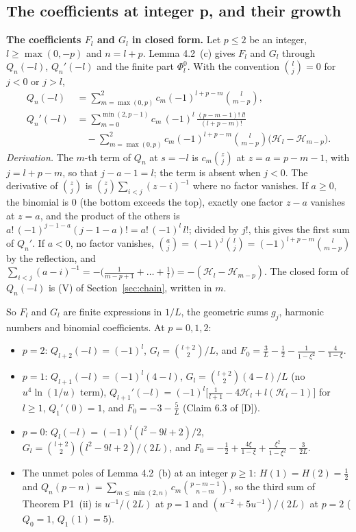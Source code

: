 \documentclass[11pt]{article}
\newcommand{\Har}{\mathcal{H}}
\begin{document}
\subsection{The coefficients at integer p, and their growth}\label{sec:coeff}

\noindent\textbf{The coefficients $F_l$ and $G_l$ in closed form.} Let $p\le2$ be an integer, $l\ge\max(0,-p)$ and $n=l+p$. Lemma 4.2~(c) gives $F_l$ and $G_l$ through $Q_n(-l)$, $Q_n'(-l)$ and the finite part $\Phi^0_l$. With the convention $\binom{l}{j}=0$ for $j<0$ or $j>l$,
\begin{align*}
Q_n(-l)&=\sum_{m=\max(0,p)}^{2}c_m(-1)^{l+p-m}\binom{l}{m-p},\\
Q_n'(-l)&=\sum_{m=0}^{\min(2,p-1)}c_m\,(-1)^l\,\frac{(p-m-1)!\;l!}{(l+p-m)!}\\
&\quad-\sum_{m=\max(0,p)}^{2}c_m(-1)^{l+p-m}\binom{l}{m-p}\bigl(\Har_l-\Har_{m-p}\bigr).
\end{align*}
\emph{Derivation.} The $m$-th term of $Q_n$ at $s=-l$ is $c_m\binom{z}{j}$ at $z=a=p-m-1$, with $j=l+p-m$, so that $j-a-1=l$; the term is absent when $j<0$. The derivative of $\binom{z}{j}$ is $\binom{z}{j}\sum_{i<j}(z-i)^{-1}$ where no factor vanishes. If $a\ge0$, the binomial is $0$ (the bottom exceeds the top), exactly one factor $z-a$ vanishes at $z=a$, and the product of the others is $a!\,(-1)^{j-1-a}(j-1-a)!=a!\,(-1)^l\,l!$; divided by $j!$, this gives the first sum of $Q_n'$. If $a<0$, no factor vanishes, $\binom{a}{j}=(-1)^j\binom{l}{j}=(-1)^{l+p-m}\binom{l}{m-p}$ by the reflection, and $\sum_{i<j}(a-i)^{-1}=-\bigl(\frac{1}{m-p+1}+\dots+\frac1l\bigr)=-(\Har_l-\Har_{m-p})$. The closed form of $Q_n(-l)$ is (V) of Section~\ref{sec:chain}, written in $m$.

So $F_l$ and $G_l$ are finite expressions in $1/L$, the geometric sums $g_j$, harmonic numbers and binomial coefficients. At $p=0,1,2$:
\begin{itemize}
\item $p=2$: $Q_{l+2}(-l)=(-1)^l$, $G_l=\binom{l+2}{2}/L$, and $F_0=\tfrac3L-\tfrac12-\tfrac{1}{1-\xi^2}-\tfrac{4}{1-\xi}$.
\item $p=1$: $Q_{l+1}(-l)=(-1)^l(4-l)$, $G_l=\binom{l+2}{2}(4-l)/L$ (no $u^4\ln(1/u)$ term), $Q_{l+1}'(-l)=(-1)^l\bigl[\frac{1}{l+1}-4\Har_l+l(\Har_l-1)\bigr]$ for $l\ge1$, $Q_1'(0)=1$, and $F_0=-3-\tfrac5L$ (Claim 6.3 of [D]).
\item $p=0$: $Q_l(-l)=(-1)^l(l^2-9l+2)/2$, $G_l=\binom{l+2}{2}(l^2-9l+2)/(2L)$, and $F_0=-\tfrac12+\tfrac{4\xi}{1-\xi}+\tfrac{\xi^2}{1-\xi^2}-\tfrac{3}{2L}$.
\item The unmet poles of Lemma 4.2~(b) at an integer $p\ge1$: $H(1)=H(2)=\frac12$ and $Q_n(p-n)=\sum_{m\le\min(2,n)}c_m\binom{p-m-1}{n-m}$, so the third sum of Theorem P1~(ii) is $u^{-1}/(2L)$ at $p=1$ and $(u^{-2}+5u^{-1})/(2L)$ at $p=2$ ($Q_0=1$, $Q_1(1)=5$).
\end{itemize}
\end{document}
